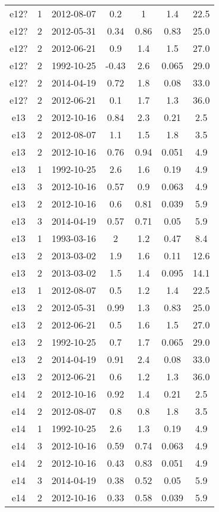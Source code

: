 \begin{table*}[htp]
\begin{tabular}{ccccccc}
e12? & 1 & 2012-08-07 & 0.2 & 1 & 1.4 & 22.5 \\
e12? & 2 & 2012-05-31 & 0.34 & 0.86 & 0.83 & 25.0 \\
e12? & 2 & 2012-06-21 & 0.9 & 1.4 & 1.5 & 27.0 \\
e12? & 2 & 1992-10-25 & -0.43 & 2.6 & 0.065 & 29.0 \\
e12? & 2 & 2014-04-19 & 0.72 & 1.8 & 0.08 & 33.0 \\
e12? & 2 & 2012-06-21 & 0.1 & 1.7 & 1.3 & 36.0 \\
e13 & 2 & 2012-10-16 & 0.84 & 2.3 & 0.21 & 2.5 \\
e13 & 2 & 2012-08-07 & 1.1 & 1.5 & 1.8 & 3.5 \\
e13 & 2 & 2012-10-16 & 0.76 & 0.94 & 0.051 & 4.9 \\
e13 & 1 & 1992-10-25 & 2.6 & 1.6 & 0.19 & 4.9 \\
e13 & 3 & 2012-10-16 & 0.57 & 0.9 & 0.063 & 4.9 \\
e13 & 2 & 2012-10-16 & 0.6 & 0.81 & 0.039 & 5.9 \\
e13 & 3 & 2014-04-19 & 0.57 & 0.71 & 0.05 & 5.9 \\
e13 & 1 & 1993-03-16 & 2 & 1.2 & 0.47 & 8.4 \\
e13 & 2 & 2013-03-02 & 1.9 & 1.6 & 0.11 & 12.6 \\
e13 & 2 & 2013-03-02 & 1.5 & 1.4 & 0.095 & 14.1 \\
e13 & 1 & 2012-08-07 & 0.5 & 1.2 & 1.4 & 22.5 \\
e13 & 2 & 2012-05-31 & 0.99 & 1.3 & 0.83 & 25.0 \\
e13 & 2 & 2012-06-21 & 0.5 & 1.6 & 1.5 & 27.0 \\
e13 & 2 & 1992-10-25 & 0.7 & 1.7 & 0.065 & 29.0 \\
e13 & 2 & 2014-04-19 & 0.91 & 2.4 & 0.08 & 33.0 \\
e13 & 2 & 2012-06-21 & 0.6 & 1.2 & 1.3 & 36.0 \\
e14 & 2 & 2012-10-16 & 0.92 & 1.4 & 0.21 & 2.5 \\
e14 & 2 & 2012-08-07 & 0.8 & 0.8 & 1.8 & 3.5 \\
e14 & 1 & 1992-10-25 & 2.6 & 1.3 & 0.19 & 4.9 \\
e14 & 3 & 2012-10-16 & 0.59 & 0.74 & 0.063 & 4.9 \\
e14 & 2 & 2012-10-16 & 0.43 & 0.83 & 0.051 & 4.9 \\
e14 & 3 & 2014-04-19 & 0.38 & 0.52 & 0.05 & 5.9 \\
e14 & 2 & 2012-10-16 & 0.33 & 0.58 & 0.039 & 5.9 \\

\end{tabular}
\end{table*}
